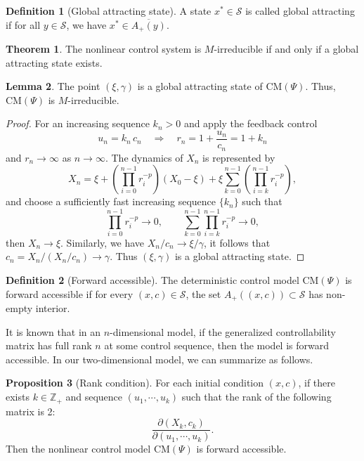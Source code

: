 \documentclass[11pt]{article}
\theoremstyle{definition}
\newtheorem{theorem}{Theorem}
\newtheorem{lemma}[theorem]{Lemma}
\newtheorem{proposition}[theorem]{Proposition}
\newtheorem{definition}{Definition}
\begin{document}
\begin{definition}[Global attracting state]
	A state $x^{*} \in \mathcal S$ is called global attracting if for all $y \in \mathcal S$, we have $x^{*}\in \overline{A_{+}(y)}$.
\end{definition}

\begin{theorem}
	The nonlinear control system is $M$-irreducible if and only if a global attracting state exists.
\end{theorem}

\begin{lemma}
	The point $(\xi, \gamma)$ is a global attracting state of $\mathrm{CM}(\Psi)$.
	Thus, $\mathrm{CM}(\Psi)$ is $M$-irreducible.
\end{lemma}
\begin{proof}
	For an increasing sequence $k_n>0$ and apply the feedback control
	$$
	u_n = k_n \,c_n \quad\Longrightarrow\quad r_n = 1+\frac{u_n}{c_n} = 1 + k_n 
	$$
	and $r_n \to \infty$ as $n \to \infty$.
	The dynamics of $X_n$ is represented by
	$$
	X_n
	= \xi + \left(\prod_{i=0}^{n-1} r_i^{-p}\right)(X_0-\xi)
	+ \xi\sum_{k=0}^{n-1}\left(\prod_{i=k}^{n-1} r_i^{-p}\right),
	$$
	and choose a sufficiently fast increasing sequence $\{k_n\}$ such that
	\[
	\prod_{i=0}^{n-1} r_i^{-p}\to 0,
	\qquad 
	\sum_{k=0}^{n-1}\prod_{i=k}^{n-1} r_i^{-p} \to 0,
	\]
	then
	$ X_n \rightarrow \xi$.
	Similarly, we have $X_n / c_n \rightarrow \xi/\gamma$, it follows that $c_n = X_n / (X_n/c_n) \to \gamma.$
	Thus $(\xi,\gamma)$ is a global attracting state.
\end{proof}

\begin{definition}[Forward accessible]
	The deterministic control model $\mathrm{CM}(\Psi)$ is forward accessible if for every $(x, c) \in \mathcal S$,
	the set $A_+((x,c)) \subset \mathcal S$ has non-empty interior.	
\end{definition}

It is known that
in an $n$-dimensional model, if the generalized controllability matrix has full rank $n$ at some control sequence, then the model is forward accessible.
In our two-dimensional model, we can summarize as follows.

\begin{proposition}[Rank condition]
	For each initial condition $(x, c)$, if there exists $k \in \mathbb{Z}_{+}$ and sequence $(u_1, \cdots, u_k)$ such that the rank of the following matrix is 2:
	$$
	\frac{\partial(X_k,c_k)}{\partial(u_1,\cdots, u_k)}.
	$$
	Then the nonlinear control model $\mathrm{CM}(\Psi)$ is forward accessible.
\end{proposition}
\end{document}
